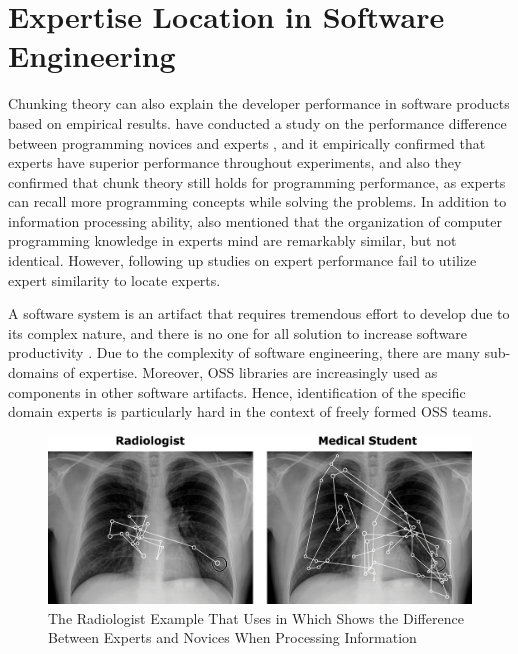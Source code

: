 \section{Expertise Location in Software Engineering}

Chunking theory can also explain the developer performance in software products based on empirical results. \citeauthor{MCKEITHEN1981307} have conducted a study on the performance difference between programming novices and experts \cite{MCKEITHEN1981307}, and it empirically confirmed that experts have superior performance throughout experiments, and also they confirmed that chunk theory still holds for programming performance, as experts can recall more programming concepts while solving the problems. In addition to information processing ability, \citeauthor{MCKEITHEN1981307} also mentioned that the organization of computer programming knowledge in experts mind are remarkably similar, but not identical. However, following up studies on expert performance fail to utilize expert similarity to locate experts.

A software system is an artifact that requires tremendous effort to develop due to its complex nature, and there is no one for all solution to increase software productivity \cite{brooks1987no}. Due to the complexity of software engineering, there are many sub-domains of expertise. Moreover, OSS libraries are increasingly used as components in other software artifacts. Hence, identification of the specific domain experts is particularly hard in the context of freely formed OSS teams.

\begin{figure}
\includegraphics[width = 0.8\columnwidth]{radiologist}
\centering
\caption{The Radiologist Example That \citeauthor{bilalić2017neuroscience} Uses in \cite{bilalić2017neuroscience} Which Shows the Difference Between Experts and Novices When Processing Information}
\label{radiologist}
\end{figure}

